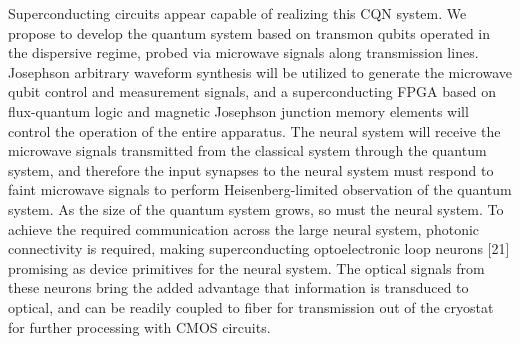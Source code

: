 \documentclass[twocolumn]{article}
\begin{document}
Superconducting circuits appear capable of realizing this CQN system. We propose to develop the quantum system based on transmon qubits operated in the dispersive regime, probed via microwave signals along transmission lines. Josephson arbitrary waveform synthesis will be utilized to generate the microwave qubit control and measurement signals, and a superconducting FPGA based on flux-quantum logic and magnetic Josephson junction memory elements will control the operation of the entire apparatus. The neural system will receive the microwave signals transmitted from the classical system through the quantum system, and therefore the input synapses to the neural system must respond to faint microwave signals to perform Heisenberg-limited observation of the quantum system. As the size of the quantum system grows, so must the neural system. To achieve the required communication across the large neural system, photonic connectivity is required, making superconducting optoelectronic loop neurons [21] promising as device primitives for the neural system. The optical signals from these neurons bring the added advantage that information is transduced to optical, and can be readily coupled to fiber for transmission out of the cryostat for further processing with CMOS circuits.
 
\end{document}
